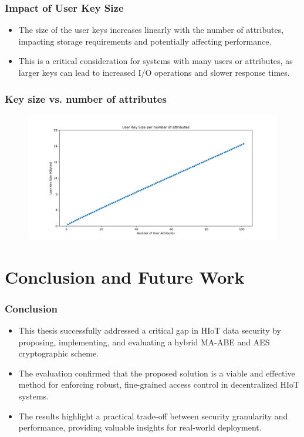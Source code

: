\documentclass{beamer}
\begin{document}
\begin{frame}
    \frametitle{Impact of User Key Size}
    \begin{itemize}
        \item The size of the user keys increases linearly with the number of attributes, impacting storage requirements and potentially affecting performance.
        \item This is a critical consideration for systems with many users or attributes, as larger keys can lead to increased I/O operations and slower response times.
    \end{itemize}
\end{frame}

\begin{frame}
    \frametitle{Key size vs. number of attributes}
    \begin{figure}
        \includegraphics[width=\textwidth,height=0.7\textheight,keepaspectratio]{images/key_size_analysis/user_key_size_analysis.png}
    \end{figure}
\end{frame}


\section{Conclusion and Future Work}

\begin{frame}
    \frametitle{Conclusion}
    \begin{itemize}
        \item This thesis successfully addressed a critical gap in HIoT data security by proposing, implementing, and evaluating a hybrid MA-ABE and AES cryptographic scheme.
        \item The evaluation confirmed that the proposed solution is a viable and effective method for enforcing robust, fine-grained access control in decentralized HIoT systems.
        \item The results highlight a practical trade-off between security granularity and performance, providing valuable insights for real-world deployment.
    \end{itemize}
\end{frame}
\end{document}
